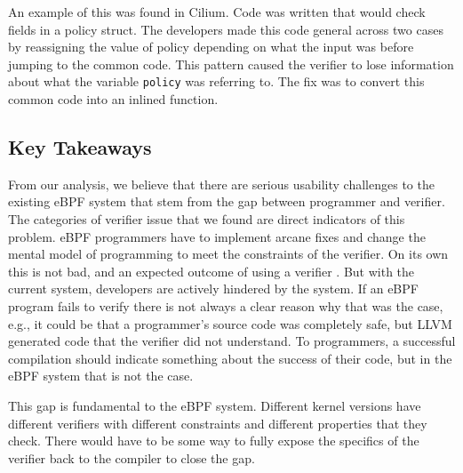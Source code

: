 An example of this was found in Cilium.
Code was written that would check fields in a policy struct.
The developers made this code general across two cases by reassigning the value of policy depending on what the input was before jumping to the common code.
This pattern caused the verifier to lose information about what the variable \verb{policy{ was referring to.
The fix was to convert this common code into an inlined function.

\subsection{Key Takeaways}
From our analysis, we believe that there are serious usability challenges to the existing eBPF system that stem from the gap between programmer and verifier.
The categories of verifier issue that we found are direct indicators of this problem.
eBPF programmers have to implement arcane fixes and change the mental model of programming to meet the constraints of the verifier.
On its own this is not bad, and an expected outcome of using a verifier
.
But with the current system, developers are actively hindered by the system.
If an eBPF program fails to verify there is not always a clear reason why that was the case, e.g.,
it could be that a programmer's source code was completely safe, but LLVM generated code that the verifier did not understand.
To programmers, a successful compilation should indicate something about the success of their code, but in the eBPF system that is not the case.

This gap is fundamental to the eBPF system.
Different kernel versions have different verifiers with different constraints and different properties that they check.
There would have to be some way to fully expose the specifics of the verifier back to the compiler to close the gap.

